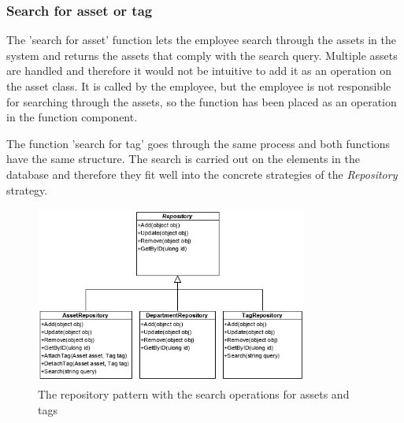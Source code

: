 \subsubsection{Search for asset or tag}
The 'search for asset' function lets the employee search through the assets in the system and returns the assets that comply with the search query. Multiple assets are handled and therefore it would not be intuitive to add it as an operation on the asset class. It is called by the employee, but the employee is not responsible for searching through the assets, so the function has been placed as an operation in the function component.
\par
The function 'search for tag' goes through the same process and both functions have the same structure. The search is carried out on the elements in the database and therefore they fit well into the concrete strategies of the \textit{Repository} strategy.
\begin{figure}[H]
    \centering
    \includegraphics[width=0.8\textwidth]{figures/FunctionComponent/Repository_pattern_with_search.png}
    \caption{The repository pattern with the search operations for assets and tags}
    \label{fig:RepositoryPatternWithSearch}
\end{figure}

